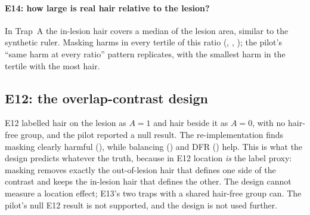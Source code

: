 \paragraph{E14: how large is real hair relative to the lesion?} In Trap~A the in-lesion hair covers a median
\sOneEFourteenMed{} of the lesion area, similar to the synthetic ruler. Masking harms in every tertile of this ratio
(\sOneEFourteenTOne, \sOneEFourteenTTwo, \sOneEFourteenTThree); the pilot's ``same harm at every ratio'' pattern
replicates, with the smallest harm in the tertile with the most hair.

\subsection{E12: the overlap-contrast design}\label{sec:e12}
E12 labelled hair on the lesion as $A=1$ and hair beside it as $A=0$, with no hair-free group, and the pilot reported
a null result. The re-implementation finds masking clearly harmful (\sOneEOneTwomask), while balancing
(\sOneEOneTwobalanced) and DFR (\sOneEOneTwodfr) help. This is what the design predicts whatever the truth, because
in E12 location \emph{is} the label proxy: masking removes exactly the out-of-lesion hair that defines one side of the
contrast and keeps the in-lesion hair that defines the other. The design cannot measure a location effect; E13's
two traps with a shared hair-free group can. The pilot's null E12 result is not supported, and the design is not used
further.

